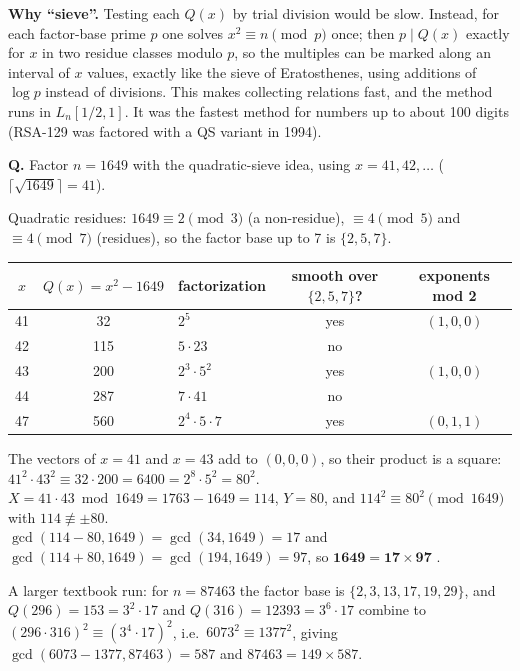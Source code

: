 \textbf{Why ``sieve''.} Testing each $Q(x)$ by trial division would be slow. Instead, for each factor-base prime $p$ one solves $x^2 \equiv n \pmod p$ once; then $p \mid Q(x)$ exactly for $x$ in two residue classes modulo $p$, so the multiples can be marked along an interval of $x$ values, exactly like the sieve of Eratosthenes, using additions of $\log p$ instead of divisions. This makes collecting relations fast, and the method runs in $L_n[1/2, 1]$. It was the fastest method for numbers up to about 100 digits (RSA-129 was factored with a QS variant in 1994).

\begin{worked}[: congruent squares for $n = 1649$]
\textbf{Q.} Factor $n = 1649$ with the quadratic-sieve idea, using $x = 41, 42, \dots$ ($\lceil\sqrt{1649}\rceil = 41$).

Quadratic residues: $1649 \equiv 2 \pmod 3$ (a non-residue), $\equiv 4 \pmod 5$ and $\equiv 4 \pmod 7$ (residues), so the factor base up to 7 is $\{2, 5, 7\}$.
\begin{center}\small
\begin{tabular}{@{}cclcc@{}}
\toprule
$x$ & $Q(x) = x^2 - 1649$ & factorization & smooth over $\{2,5,7\}$? & exponents mod 2\\
\midrule
41 & 32 & $2^5$ & yes & $(1, 0, 0)$\\
42 & 115 & $5 \cdot 23$ & no & \\
43 & 200 & $2^3 \cdot 5^2$ & yes & $(1, 0, 0)$\\
44 & 287 & $7 \cdot 41$ & no & \\
47 & 560 & $2^4 \cdot 5 \cdot 7$ & yes & $(0, 1, 1)$\\
\bottomrule
\end{tabular}
\end{center}
The vectors of $x = 41$ and $x = 43$ add to $(0, 0, 0)$, so their product is a square: $41^2 \cdot 43^2 \equiv 32 \cdot 200 = 6400 = 2^8 \cdot 5^2 = 80^2$.\\
$X = 41 \cdot 43 \bmod 1649 = 1763 - 1649 = 114$, \;$Y = 80$, and $114^2 \equiv 80^2 \pmod{1649}$ with $114 \not\equiv \pm 80$.\\
$\gcd(114 - 80, 1649) = \gcd(34, 1649) = 17$ and $\gcd(114 + 80, 1649) = \gcd(194, 1649) = 97$, so $\mathbf{1649 = 17 \times 97}$ \checkmark.
\end{worked}
A larger textbook run: for $n = 87463$ the factor base is $\{2, 3, 13, 17, 19, 29\}$, and $Q(296) = 153 = 3^2 \cdot 17$ and $Q(316) = 12393 = 3^6 \cdot 17$ combine to $(296 \cdot 316)^2 \equiv (3^4 \cdot 17)^2$, i.e.\ $6073^2 \equiv 1377^2$, giving $\gcd(6073 - 1377, 87463) = 587$ and $87463 = 149 \times 587$.

